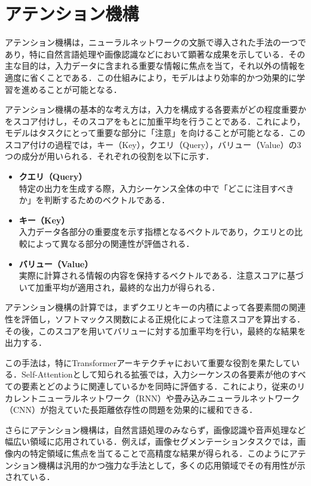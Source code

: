 
\section{アテンション機構}
アテンション機構\cite{vaswani2017attention}は，ニューラルネットワークの文脈で導入された手法の一つであり，特に自然言語処理や画像認識などにおいて顕著な成果を示している．その主な目的は，入力データに含まれる重要な情報に焦点を当て，それ以外の情報を適度に省くことである．この仕組みにより，モデルはより効率的かつ効果的に学習を進めることが可能となる．

アテンション機構の基本的な考え方は，入力を構成する各要素がどの程度重要かをスコア付けし，そのスコアをもとに加重平均を行うことである．これにより，モデルはタスクにとって重要な部分に「注意」を向けることが可能となる．このスコア付けの過程では，キー（Key），クエリ（Query），バリュー（Value）の3つの成分が用いられる．それぞれの役割を以下に示す．

\begin{itemize}
  \item \textbf{クエリ（Query）}\\
  特定の出力を生成する際，入力シーケンス全体の中で「どこに注目すべきか」を判断するためのベクトルである．
  \item \textbf{キー（Key）}\\
  入力データ各部分の重要度を示す指標となるベクトルであり，クエリとの比較によって異なる部分の関連性が評価される．
  \item \textbf{バリュー（Value）}\\
  実際に計算される情報の内容を保持するベクトルである．注意スコアに基づいて加重平均が適用され，最終的な出力が得られる．
\end{itemize}

アテンション機構の計算では，まずクエリとキーの内積によって各要素間の関連性を評価し，ソフトマックス関数による正規化によって注意スコアを算出する．その後，このスコアを用いてバリューに対する加重平均を行い，最終的な結果を出力する．

この手法は，特にTransformerアーキテクチャにおいて重要な役割を果たしている．Self-Attentionとして知られる拡張では，入力シーケンスの各要素が他のすべての要素とどのように関連しているかを同時に評価する．これにより，従来のリカレントニューラルネットワーク（RNN）や畳み込みニューラルネットワーク（CNN）\cite{fukushima1980neocognitron-cnn,lecun1989backpropagation-cnn}が抱えていた長距離依存性の問題を効果的に緩和できる．

さらにアテンション機構は，自然言語処理のみならず，画像認識や音声処理など幅広い領域に応用されている．例えば，画像セグメンテーションタスクでは，画像内の特定領域に焦点を当てることで高精度な結果が得られる．このようにアテンション機構は汎用的かつ強力な手法として，多くの応用領域でその有用性が示されている．


\newpage
